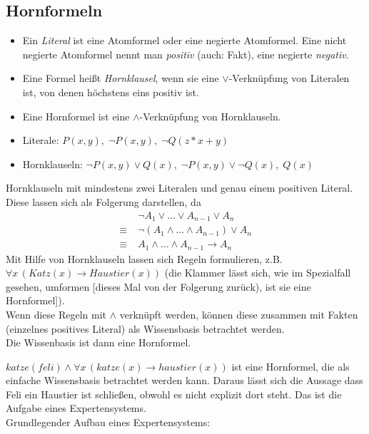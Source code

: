 \subsection{Hornformeln}
\begin{itemize}
\item Ein \emph{Literal} ist eine Atomformel oder eine negierte Atomformel. Eine nicht negierte Atomformel nennt man \emph{positiv} (auch: Fakt), eine negierte \emph{negativ}. 
\item Eine Formel heißt \emph{Hornklausel}, wenn sie eine $\vee$-Verknüpfung von Literalen ist, von denen höchstens eins positiv ist.
\item Eine Hornformel ist eine $\wedge$-Verknüpfung von Hornklauseln.
\end{itemize}

\begin{itemize}
\item Literale: $P(x,y),\; \neg P(x,y), \; \neg Q(z *x+y)$
\item Hornklauseln: $\neg P(x,y) \vee Q(x),\; \neg P(x,y) \vee \neg Q (x), \; Q(x)$
\end{itemize}

 Hornklauseln mit mindestens zwei Literalen und genau einem positiven Literal. Diese lassen sich als Folgerung darstellen, da
\begin{align*}
&\neg A_1 \vee \dots \vee A_{n-1}\vee A_n\\
\equiv\;& \neg (A_1 \wedge \dots \wedge A_{n-1})\vee A_n\\
\equiv\; & A_1 \wedge \dots \wedge A_{n-1} \to A_n
\end{align*}
Mit Hilfe von Hornklauseln lassen sich Regeln formulieren, z.B. $\forall x \, (Katz(x) \to Haustier(x))$ (die Klammer lässt sich, wie im Spezialfall gesehen, umformen [dieses Mal von der Folgerung zurück), ist sie eine Hornformel]).\\
Wenn diese Regeln mit $\wedge$ verknüpft werden, können diese zusammen mit Fakten (einzelnes positives Literal) als Wissensbasis betrachtet werden.\\
Die Wissenbasis ist dann eine Hornformel.

\parskp
$katze(feli) \wedge \forall x \, (katze(x) \to haustier(x))$ ist eine Hornformel, die als einfache Wissensbasis betrachtet werden kann. Daraus lässt sich die Aussage dass Feli ein Haustier ist schließen, obwohl es nicht explizit dort steht. Das ist die Aufgabe eines Expertensystems.\\
Grundlegender Aufbau eines Expertensystems:
\begin{center}
\end{center}

